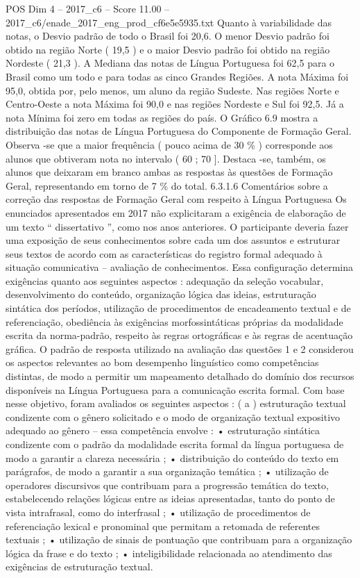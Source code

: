 \begin{textsample}{POS Dim 4 – 2017\_c6 – Score 11.00 – 2017\_c6/enade\_2017\_eng\_prod\_cf6e5e5935.txt}
Quanto à variabilidade das notas, o Desvio padrão de todo o Brasil foi 20,6.
O menor Desvio padrão foi obtido na região Norte ( 19,5 ) e o maior Desvio padrão foi obtido na região Nordeste ( 21,3 ).
A Mediana das notas de Língua Portuguesa foi 62,5 para o Brasil como um todo e para todas as cinco Grandes Regiões.
A nota Máxima foi 95,0, obtida por, pelo menos, um aluno da região Sudeste.
Nas regiões Norte e Centro-Oeste a nota Máxima foi 90,0 e nas regiões Nordeste e Sul foi 92,5.
Já a nota Mínima foi zero em todas as regiões do país.
O Gráfico 6.9 mostra a distribuição das notas de Língua Portuguesa do Componente de Formação Geral.
Observa -se que a maior frequência ( pouco acima de 30 \% ) corresponde aos alunos que obtiveram nota no intervalo ( 60 ; 70 ].
Destaca -se, também, os alunos que deixaram em branco ambas as respostas às questões de Formação Geral, representando em torno de 7 \% do total. 6.3.1.6 Comentários sobre a correção das respostas de Formação Geral com respeito à Língua Portuguesa Os enunciados apresentados em 2017 não explicitaram a exigência de elaboração de um texto “ dissertativo ”, como nos anos anteriores.
O participante deveria fazer uma exposição de seus conhecimentos sobre cada um dos assuntos e estruturar seus textos de acordo com as características do registro formal adequado à situação comunicativa – avaliação de conhecimentos.
Essa configuração determina exigências quanto aos seguintes aspectos : adequação da seleção vocabular, desenvolvimento do conteúdo, organização lógica das ideias, estruturação sintática dos períodos, utilização de procedimentos de encadeamento textual e de referenciação, obediência às exigências morfossintáticas próprias da modalidade escrita da norma-padrão, respeito às regras ortográficas e às regras de acentuação gráfica.
O padrão de resposta utilizado na avaliação das questões 1 e 2 considerou os aspectos relevantes ao bom desempenho linguístico como competências distintas, de modo a permitir um mapeamento detalhado do domínio dos recursos disponíveis na Língua Portuguesa para a comunicação escrita formal.
Com base nesse objetivo, foram avaliados os seguintes aspectos : ( a ) estruturação textual condizente com o gênero solicitado e o modo de organização textual expositivo adequado ao gênero – essa competência envolve : • estruturação sintática condizente com o padrão da modalidade escrita formal da língua portuguesa de modo a garantir a clareza necessária ; • distribuição do conteúdo do texto em parágrafos, de modo a garantir a sua organização temática ; • utilização de operadores discursivos que contribuam para a progressão temática do texto, estabelecendo relações lógicas entre as ideias apresentadas, tanto do ponto de vista intrafrasal, como do interfrasal ; • utilização de procedimentos de referenciação lexical e pronominal que permitam a retomada de referentes textuais ; • utilização de sinais de pontuação que contribuam para a organização lógica da frase e do texto ; • inteligibilidade relacionada ao atendimento das exigências de estruturação textual.

\end{textsample}
